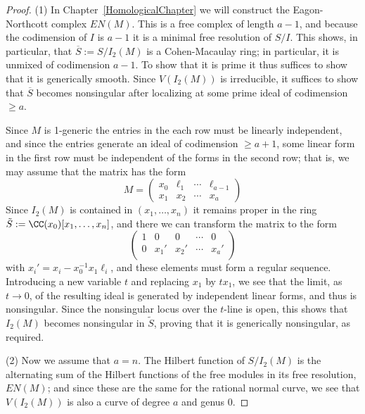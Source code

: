 \begin{proof} 
(1) In Chapter~\ref{HomologicalChapter} we will construct the Eagon-Northcott complex $EN(M)$. This is a free complex
of length $a-1$, and because the codimension of $I$ is $a-1$ it is a minimal free resolution of $S/I$. This shows,
in particular, that $\overline S := S/I_2(M)$ is a Cohen-Macaulay ring; in particular, it is unmixed of codimension $a-1$.
To show that it is prime it thus suffices to show that it is generically smooth. Since $V(I_2(M))$ is irreducible,
it suffices to show that $\overline S$ becomes nonsingular after localizing at some prime ideal of codimension $\geq a$.

Since $M$ is 1-generic the entries in the each row must be linearly independent, and since the entries generate an ideal of codimension $\geq a+1$, some linear form in the first row must be independent of the forms in the second row; that is, we may assume that the matrix has the form
$$
M = \begin{pmatrix}
x_0&\ell_1&\cdots&\ell_{a-1}\\
x_1&x_2&\cdots&x_a
\end{pmatrix}
$$ 
Since $I_2(M)$ is contained in $(x_1,\dots, x_n)$ it remains
proper in the ring $\tilde S := \CC(x_0)[x_1,\dots, x_n]$, and there we can transform the matrix to the form
$$
\begin{pmatrix}
1&0&0&\cdots&0\\
0&x_1'&x_2'&\cdots&x_{a}'\\
\end{pmatrix}
$$
with $x_{i}' = x_i- x_0^{-1}x_1\ell_i$, and these elements must form a regular sequence. Introducing a new variable $t$ and replacing $x_1$ by $tx_1$, we
see that the limit, as $t\to 0$, of the resulting ideal is generated by independent linear forms, and thus
is nonsingular. Since the nonsingular locus over the $t$-line is open, this shows that $I_2(M)$ becomes nonsingular
in $\tilde S$, proving that it is generically nonsingular, as required.

(2) Now we assume that $a=n$. The Hilbert function of $S/I_2(M)$ is the alternating sum of the Hilbert functions
of the free modules in its free resolution, $EN(M)$; and since these are the same for the rational normal curve,
we see that $V(I_2(M))$ is also a curve of degree $a$ and genus 0.
\end{proof}
%
%
%


